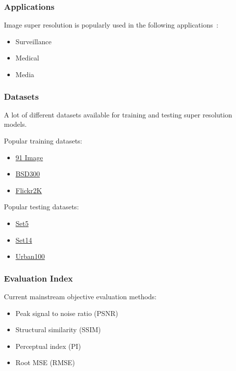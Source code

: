 \documentclass[11pt, presentation]{beamer}
\begin{document}
    \begin{frame}
        \frametitle{Applications}
        Image super resolution is popularly used in the following applications~\cite{psrsisr}:
        \begin{itemize}
            \item Surveillance
            \item Medical
            \item Media
        \end{itemize}
    \end{frame}
    \begin{frame}
        \frametitle{Datasets}
        A lot of different datasets available for training and testing super resolution models.

        Popular training datasets:
        \begin{itemize}
            \item \href{ http://www.ifp.illinois.edu/~jyang29/codes/ScSR.rar}{91 Image}
            \item\href{ https://www2.eecs.berkeley.edu/Research/Projects/CS/vision/grouping/segbench/BSDS300-images.tgz}{BSD300} 
            \item\href{http://cv.snu.ac.kr/research/EDSR/Flickr2K.tar}{Flickr2K}
        \end{itemize}
        Popular testing datasets:
        \begin{itemize}
            \item \href{http://people.rennes.inria.fr/Aline.Roumy/results/SR_BMVC12.html}{Set5}
            \item\href{https://github.com/jbhuang0604/SelfExSR}{Set14}
            \item \href{https://sites.google.com/site/jbhuang0604/publications/struct_sr}{Urban100}
        \end{itemize}
    \end{frame}
    \begin{frame}
        \frametitle{Evaluation Index}
        Current mainstream objective evaluation methods:
        \begin{itemize}
            \item Peak signal to noise ratio (PSNR)
            \item Structural similarity (SSIM)
            \item Perceptual index (PI)
            \item Root MSE (RMSE)
        \end{itemize}
    \end{frame}
\end{document}
